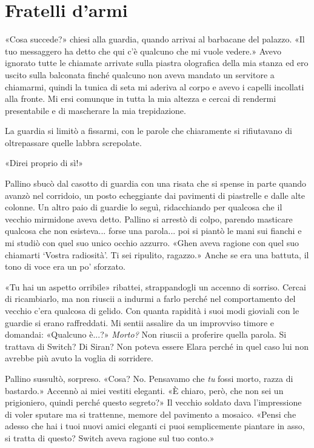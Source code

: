 \chapter{Fratelli d'armi}

«Cosa succede?» chiesi alla guardia, quando arrivai al barbacane del
palazzo. «Il tuo messaggero ha detto che qui c'è qualcuno che mi vuole
vedere.» Avevo ignorato tutte le chiamate arrivate sulla piastra
olografica della mia stanza ed ero uscito sulla balconata finché
qualcuno non aveva mandato un servitore a chiamarmi, quindi la tunica di
seta mi aderiva al corpo e avevo i capelli incollati alla fronte. Mi
ersi comunque in tutta la mia altezza e cercai di rendermi presentabile
e di mascherare la mia trepidazione.

La guardia si limitò a fissarmi, con le parole che chiaramente si
rifiutavano di oltrepassare quelle labbra screpolate.

«Direi proprio di sì!»

Pallino sbucò dal casotto di guardia con una risata che si spense in
parte quando avanzò nel corridoio, un posto echeggiante dai pavimenti di
piastrelle e dalle alte colonne. Un altro paio di guardie lo seguì,
ridacchiando per qualcosa che il vecchio mirmidone aveva detto. Pallino
si arrestò di colpo, parendo masticare qualcosa che non esisteva...
forse una parola... poi si piantò le mani sui fianchi e mi studiò con
quel suo unico occhio azzurro. «Ghen aveva ragione con quel suo
chiamarti `Vostra radiosità'. Ti sei ripulito, ragazzo.» Anche se era
una battuta, il tono di voce era un po' sforzato.

«Tu hai un aspetto orribile» ribattei, strappandogli un accenno di
sorriso. Cercai di ricambiarlo, ma non riuscii a indurmi a farlo perché
nel comportamento del vecchio c'era qualcosa di gelido. Con quanta
rapidità i suoi modi gioviali con le guardie si erano raffreddati. Mi
sentii assalire da un improvviso timore e domandai: «Qualcuno è...?»
\emph{Morto?} Non riuscii a proferire quella parola. Si trattava di
Switch? Di Siran? Non poteva essere Elara perché in quel caso lui non
avrebbe più avuto la voglia di sorridere.

Pallino sussultò, sorpreso. «Cosa? No. Pensavamo che \emph{tu} fossi
morto, razza di bastardo.» Accennò ai miei vestiti eleganti. «È chiaro,
però, che non sei un prigioniero, quindi perché questo segreto?» Il
vecchio soldato dava l'impressione di voler sputare ma si trattenne,
memore del pavimento a mosaico. «Pensi che adesso che hai i tuoi nuovi
amici eleganti ci puoi semplicemente piantare in asso, si tratta di
questo? Switch aveva ragione sul tuo conto.»

